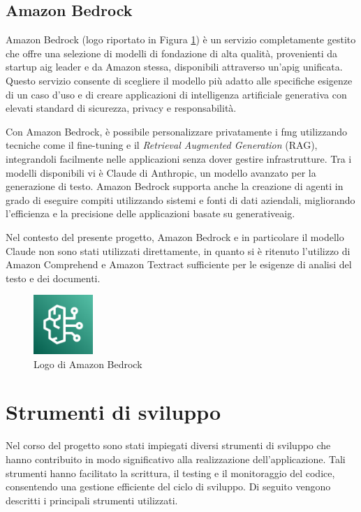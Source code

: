 \subsection{Amazon Bedrock}
Amazon Bedrock (logo riportato in Figura \ref{fig:bedrock}) è un servizio completamente gestito che offre una selezione di modelli di fondazione  di alta qualità, provenienti da startup \gls{aig} leader e da Amazon stessa, disponibili attraverso un'\gls{apig} unificata. Questo servizio consente di scegliere il modello più adatto alle specifiche esigenze di un caso d'uso e di creare applicazioni di intelligenza artificiale generativa con elevati standard di sicurezza, privacy e responsabilità. 

Con Amazon Bedrock, è possibile personalizzare privatamente i \gls{fmg} utilizzando tecniche come il fine-tuning e il \textit{Retrieval Augmented Generation} (RAG), integrandoli facilmente nelle applicazioni senza dover gestire infrastrutture. Tra i modelli disponibili vi è Claude di Anthropic, un modello avanzato per la generazione di testo. Amazon Bedrock supporta anche la creazione di agenti in grado di eseguire compiti utilizzando sistemi e fonti di dati aziendali, migliorando l'efficienza e la precisione delle applicazioni basate su \gls{generativeaig}.

Nel contesto del presente progetto, Amazon Bedrock e in particolare il modello Claude non sono stati utilizzati direttamente, in quanto si è ritenuto l'utilizzo di Amazon Comprehend e Amazon Textract sufficiente per le esigenze di analisi del testo e dei documenti.

\begin{figure}[h]
  \centering
  \includegraphics[width=0.2\textwidth]{img/tecnologie/bedrock.png}
  \caption{Logo di Amazon Bedrock}
  \label{fig:bedrock}
\end{figure}

\section{Strumenti di sviluppo}

Nel corso del progetto sono stati impiegati diversi strumenti di sviluppo che hanno contribuito in modo significativo alla realizzazione dell'applicazione. Tali strumenti hanno facilitato la scrittura, il testing e il monitoraggio del codice, consentendo una gestione efficiente del ciclo di sviluppo. Di seguito vengono descritti i principali strumenti utilizzati.

